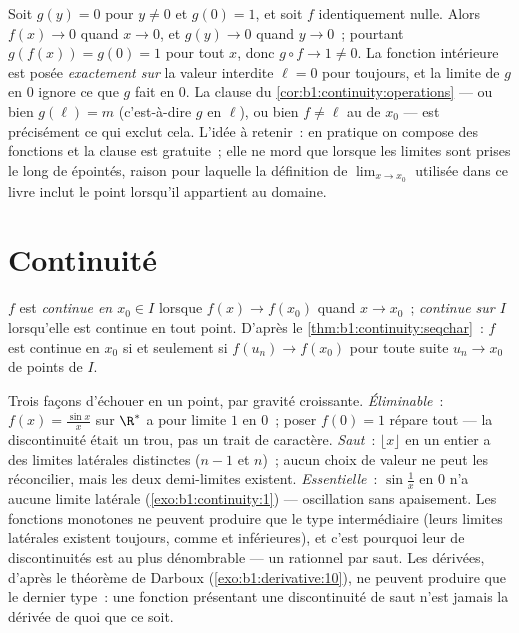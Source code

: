 \begin{example}\label{ex:b1:continuity:compositiontrap}
Soit $g(y) = 0$ pour $y \neq 0$ et $g(0) = 1$, et soit $f$
identiquement nulle. Alors $f(x) \to 0$ quand $x \to 0$, et $g(y)
\to 0$ quand $y \to 0$~; pourtant $g(f(x)) = g(0) = 1$ pour tout
$x$, donc $g \circ f \to 1 \neq 0$. La fonction intérieure est
posée \emph{exactement sur} la valeur interdite $\ell = 0$ pour
toujours, et la limite de $g$ en $0$ ignore ce que $g$ fait en
$0$. La clause du
\cref{cor:b1:continuity:operations} --- ou bien $g(\ell) = m$
(c'est-à-dire $g$  en $\ell$), ou bien $f \neq \ell$ au
 de $x_0$ --- est précisément ce qui exclut cela.
L'idée à retenir~: en pratique on compose des fonctions
\emph{} et la clause est gratuite~; elle ne mord que
lorsque les limites sont prises le long de  épointés,
raison pour laquelle la définition de $\lim_{x \to x_0}$ utilisée
dans ce livre inclut le point lorsqu'il appartient au domaine.
\end{example}

\section{Continuité}

\begin{definition}\label{def:b1:continuity:continuous}
$f$ est \emph{continue en $x_0 \in I$} lorsque
$f(x) \to f(x_0)$ quand $x \to x_0$~; \emph{continue sur $I$}
lorsqu'elle est continue en tout point. D'après le
\cref{thm:b1:continuity:seqchar}~: $f$ est continue en $x_0$ si et
seulement si $f(u_n) \to f(x_0)$ pour toute suite $u_n \to x_0$ de
points de $I$.
\end{definition}

\begin{example}\label{ex:b1:continuity:taxonomy}
Trois façons d'échouer en un point, par gravité croissante.
\emph{Éliminable}~: $f(x) = \frac{\sin x}{x}$ sur $\R^*$ a pour
limite $1$ en $0$~; poser $f(0) = 1$ répare tout --- la
discontinuité était un trou, pas un trait de caractère.
\emph{Saut}~: $\lfloor x \rfloor$ en un entier a des limites
latérales distinctes ($n - 1$ et $n$)~; aucun choix de valeur ne
peut les réconcilier, mais les deux demi-limites existent.
\emph{Essentielle}~: $\sin\frac1x$ en $0$ n'a aucune limite
latérale (\cref{exo:b1:continuity:1}) --- oscillation sans
apaisement. Les fonctions monotones ne peuvent produire que le
type intermédiaire (leurs limites latérales existent toujours,
comme  et inférieures), et c'est pourquoi leur
 de discontinuités est au plus dénombrable --- un
rationnel par saut. Les dérivées, d'après le théorème de Darboux
(\cref{exo:b1:derivative:10}), ne peuvent produire que le
dernier type~: une fonction présentant une discontinuité de
saut n'est jamais la dérivée de quoi que ce soit.
\end{example}

